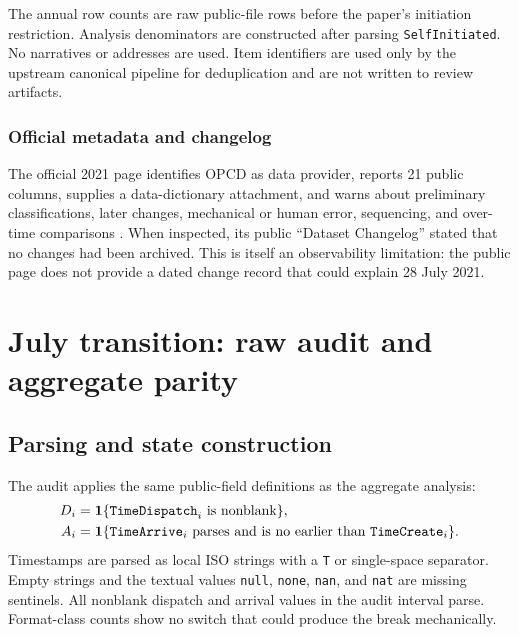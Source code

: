 \documentclass[11pt]{article}
\begin{document}
The annual row counts are raw public-file rows before the paper's initiation restriction. Analysis denominators are constructed after parsing \texttt{SelfInitiated}. No narratives or addresses are used. Item identifiers are used only by the upstream canonical pipeline for deduplication and are not written to review artifacts.

\subsubsection{Official metadata and changelog}

The official 2021 page identifies OPCD as data provider, reports 21 public columns, supplies a data-dictionary attachment, and warns about preliminary classifications, later changes, mechanical or human error, sequencing, and over-time comparisons \citep{DataNOLA2021}. When inspected, its public ``Dataset Changelog'' stated that no changes had been archived. This is itself an observability limitation: the public page does not provide a dated change record that could explain 28 July 2021.

\section{July transition: raw audit and aggregate parity}

\subsection{Parsing and state construction}

The audit applies the same public-field definitions as the aggregate analysis:
\begin{align}
D_i &= \mathbf{1}\{\texttt{TimeDispatch}_i \text{ is nonblank}\},\\
A_i &= \mathbf{1}\{\texttt{TimeArrive}_i \text{ parses and is no earlier than }\texttt{TimeCreate}_i\}.
\end{align}
Timestamps are parsed as local ISO strings with a \texttt{T} or single-space separator. Empty strings and the textual values \texttt{null}, \texttt{none}, \texttt{nan}, and \texttt{nat} are missing sentinels. All nonblank dispatch and arrival values in the audit interval parse. Format-class counts show no switch that could produce the break mechanically.
\end{document}
